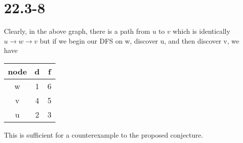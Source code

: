 \documentclass{article}
\begin{document}
  \section*{22.3-8}
  \begin{center}
  \end{center}
  Clearly, in the above graph, there is a path from $u$ to $v$ which is identically
  $u \to w \to v$ but if we begin our DFS on w, discover u, and then discover v, we have 

  \begin{center}
  \begin{tabular}{|c|c|c|}
    \hline
    node & d & f \\ \hline
    w & 1 & 6    \\ \hline
    v & 4 & 5    \\ \hline
    u & 2 & 3    \\ \hline
  \end{tabular}
  \end{center}
  This is sufficient for a counterexample to the proposed conjecture.
\end{document}
